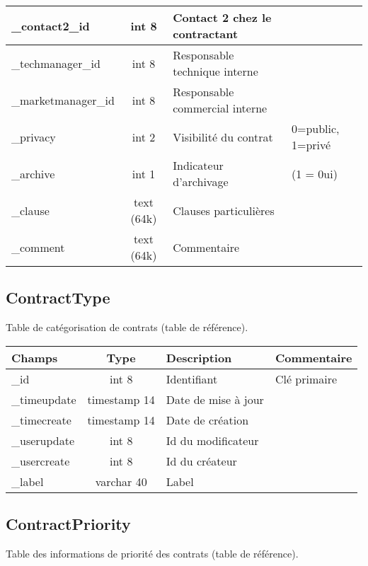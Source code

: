 \begin{tabular}{|p{3cm}|c|p{5.4cm}|p{2.6cm}|}
\hline
\_contact2\_id & int 8 & Contact 2 chez le contractant &\\
\hline
\_techmanager\_id & int 8 & Responsable technique interne &\\
\hline
\_marketmanager\_id & int 8 & Responsable commercial interne &\\
\hline
\_privacy & int 2 & Visibilité du contrat & 0=public, 1=privé\\
\hline
\_archive & int 1 & Indicateur d'archivage & (1 = 0ui)\\
\hline
\_clause & text (64k) & Clauses particulières &\\
\hline
\_comment & text (64k) & Commentaire &\\
\hline
\end{tabular}
	 
	
\subsection{ContractType}

Table de catégorisation de contrats (table de référence).

\begin{tabular}{|p{3cm}|c|p{5.4cm}|p{2.6cm}|}
\hline
\textbf{Champs} & \textbf{Type} & \textbf{Description} & \textbf{Commentaire} \\
\hline
\_id & int 8 & Identifiant & Clé primaire \\
\hline
\_timeupdate & timestamp 14 & Date de mise à jour & \\
\hline
\_timecreate & timestamp 14 & Date de création & \\
\hline
\_userupdate & int 8 & Id du modificateur & \\
\hline
\_usercreate & int 8 & Id du créateur & \\
\hline
\_label & varchar 40 & Label & \\
\hline
\end{tabular}


\subsection{ContractPriority}

Table des informations de priorité des contrats (table de référence).\\

